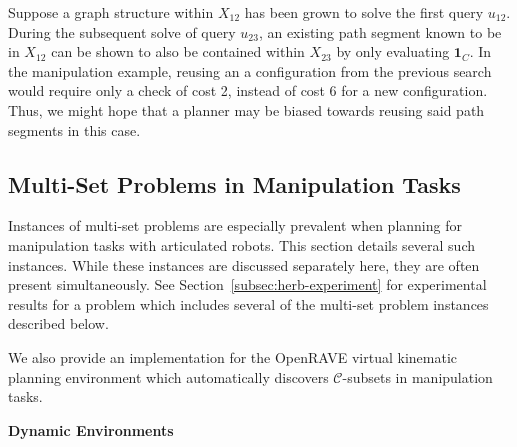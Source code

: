 Suppose a graph structure within ${X_{12}}$ has been grown to solve
the first query $u_{12}$.
During the subsequent solve of query $u_{23}$,
an existing path segment known to be in ${X_{12}}$ can be shown to
also be contained within ${X_{23}}$ by only evaluating $\mathbf{1}_C$.
In the manipulation example,
reusing an a configuration from the previous search
would require only a check of cost 2,
instead of cost 6 for a new configuration.
Thus, we might hope that a planner may be biased towards reusing
said path segments in this case.

\subsection{Multi-Set Problems in Manipulation Tasks}
\label{sec:in-manipulation}

Instances of multi-set problems are especially prevalent when
planning for manipulation tasks with articulated robots.
This section details several such instances.
While these instances are discussed separately here,
they are often present simultaneously.
See Section~\ref{subsec:herb-experiment}
for experimental results for a problem
which includes several of the multi-set problem instances
described below.

We also provide an implementation for the
OpenRAVE \citep{diankov2010openrave}
virtual kinematic planning environment
which automatically discovers $\mathcal{C}$-subsets
in manipulation tasks.

\vspace{0.1in}
\noindent
\textbf{Dynamic Environments}
\label{subsec:dynamic-environments}

